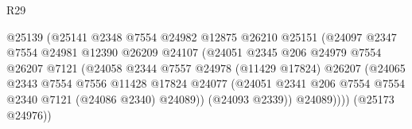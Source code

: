 \begin{lexlean}{R29}
\begin{coremodule}
                                          @25139
                                          (@25141
                                            @2348
                                            @7554
                                            @24982
                                            @12875
                                            @26210
                                            @25151
                                            (@24097
                                              @2347
                                              @7554
                                              @24981
                                              @12390
                                              @26209
                                              @24107
                                              (@24051
                                                @2345
                                                @206
                                                @24979
                                                @7554
                                                @26207
                                                @7121
                                                (@24058
                                                  @2344
                                                  @7557
                                                  @24978
                                                  (@11429 @17824)
                                                  @26207
                                                  (@24065
                                                    @2343
                                                    @7554
                                                    @7556
                                                    @11428
                                                    @17824
                                                    @24077
                                                    (@24051
                                                      @2341
                                                      @206
                                                      @7554
                                                      @7554
                                                      @2340
                                                      @7121
                                                      (@24086 @2340)
                                                      @24089))
                                                  (@24093 @2339))
                                                @24089))))
                                        (@25173 @24976))

\end{coremodule}
\end{lexlean}
